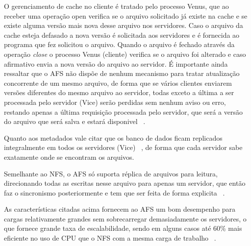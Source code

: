     O gerenciamento de cache no cliente é tratado pelo processo Venus, que ao receber uma operação open verifica se o arquivo solicitado já existe na cache e se existe alguma versão mais nova desse arquivo nos servidores. Caso o arquivo da cache esteja defasado a nova versão é solicitada aos servidores e é fornecida ao programa que fez solicitou o arquivo. Quando o arquivo é fechado através da operação \textit{close} o processo Venus (cliente) verifica se o arquivo foi alterado e caso afirmativo envia a nova versão do arquivo ao servidor. É importante ainda ressaltar que o AFS não dispõe de nenhum mecanismo para tratar atualização concorrente de um mesmo arquivo, de forma que se vários clientes enviarem versões diferentes do mesmo arquivo ao servidor, todas exceto a última a ser processada pelo servidor (Vice) serão perdidas sem nenhum aviso ou erro, restando apenas a última requisição processada pelo servidor, que será a versão do arquivo que será salva e estará disponivel ~\cite{coulouris}.
    
    Quanto aos metadados vale citar que os banco de dados ficam replicados integralmente em todos os servidores (Vice) ~\cite{coulouris}, de forma que cada servidor sabe exatamente onde se encontram os arquivos.
    
    Semelhante ao NFS, o AFS só suporta réplica de arquivos para leitura, direcionando todas as escritas nesse arquivo para apenas um servidor, que então faz o sincronismo posteriormente e tem que ser feita de forma explicita ~\cite{coulouris}.
    
    As características citadas acima fornecem ao AFS um bom desempenho para cargas relativamente grandes sem sobrecarregar demasiadamente os servidores, o que fornece grande taxa de escalabilidade, sendo em alguns casos até 60\% mais eficiente no uso de CPU que o NFS com a mesma carga de trabalho ~\cite{coulouris}.
  

    
                                            
